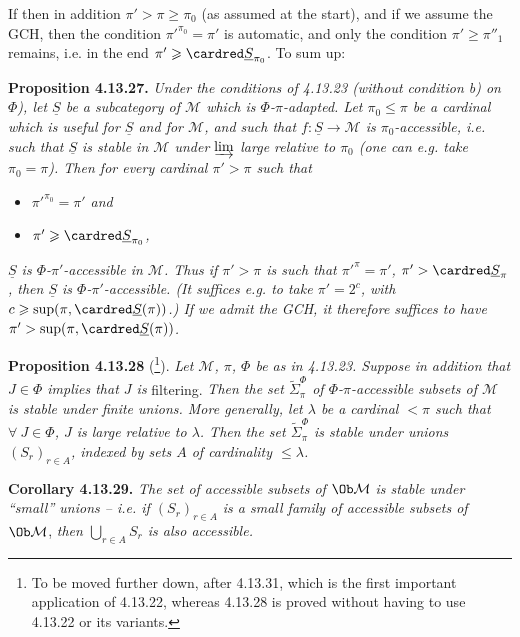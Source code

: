 If then in addition $\pi'>\pi\geqslant\pi_0$ (as assumed at the start), and if we assume the GCH, then the condition $\pi'^{\pi_0}=\pi'$ is automatic, and only the condition $\pi'\geqslant\pi''_1$ remains, i.e. in the end $\pi'\geqslant\cardred\underline{S}_{\pi_0}$. To sum up:

\textbf{Proposition 4.13.27.} \textit{Under the conditions of 4.13.23 (without condition b) on $\Phi$), let $\underline{S}$ be a subcategory of $\mathcal{M}$ which is $\Phi$-$\pi$-adapted. Let $\pi_0\leqslant\pi$ be a cardinal which is useful for $\underline{S}$ and for $\mathcal{M}$, and such that $f:\underline{S}\longrightarrow\mathcal{M}$ is $\pi_0$-accessible, i.e. such that $\underline{S}$ is stable in $\mathcal{M}$ under $\varinjlim$ large relative to $\pi_0$ (one can e.g. take $\pi_0=\pi$). Then for every cardinal $\pi'>\pi$ such that}
\begin{itemize}[leftmargin=2.5em]
\item[\textit{a)}] \textit{$\pi'^{\pi_0}=\pi'$ and}
\item[\textit{b)}] \textit{$\pi'\geqslant\cardred\underline{S}_{\pi_0}$,}
\end{itemize}
\textit{$\underline{S}$ is $\Phi$-$\pi'$-accessible in $\mathcal{M}$. Thus if $\pi'>\pi$ is such that $\pi'^{\pi}=\pi'$, $\pi'>\cardred\underline{S}_\pi$, then $\underline{S}$ is $\Phi$-$\pi'$-accessible. (It suffices e.g. to take $\pi'=2^c$, with $c\geqslant\sup(\pi,\cardred\underline{S}(\pi))$.) If we admit the GCH, it therefore suffices to have $\pi'>\sup(\pi,\cardred\underline{S}(\pi))$.}

\textbf{Proposition 4.13.28} (\footnote{To be moved further down, after 4.13.31, which is the first important application of 4.13.22, whereas 4.13.28 is proved without having to use 4.13.22 or its variants.}). \textit{Let $\mathcal{M}$, $\pi$, $\Phi$ be as in 4.13.23. Suppose in addition that $J\in\Phi$ implies that $J$ is} filtering. \textit{Then the set $\tilde{\Sigma}^{\Phi}_{\pi}$ of $\Phi$-$\pi$-accessible subsets of $\mathcal{M}$ is stable under finite unions. More generally, let $\lambda$ be a cardinal $<\pi$ such that $\forall\ J\in\Phi$, $J$ is large relative to $\lambda$. Then the set $\tilde{\Sigma}^{\Phi}_{\pi}$ is stable under unions $(S_r)_{r\in A}$, indexed by sets $A$ of cardinality $\leqslant\lambda$.}

\textbf{Corollary 4.13.29.} \textit{The set of accessible subsets of} $\Ob\mathcal{M}$ \textit{is stable under ``small'' unions -- i.e. if $(S_r)_{r\in A}$ is a small family of accessible subsets of} $\Ob\mathcal{M}$, \textit{then $\bigcup_{r\in A}S_r$ is also accessible.}

